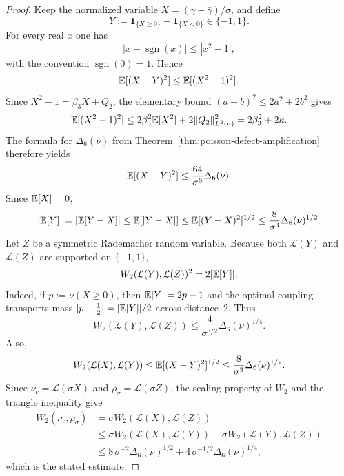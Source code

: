 \begin{proof}
Keep the normalized variable $X=(\gamma-\bar\gamma)/\sigma$, and define
\[
Y:=\mathbf{1}_{\{X\ge 0\}}-\mathbf{1}_{\{X<0\}}\in\{-1,1\}.
\]
For every real $x$ one has
\[
|x-\operatorname{sgn}(x)|\le |x^2-1|,
\]
with the convention $\operatorname{sgn}(0)=1$.  Hence
\[
\mathbb{E}[(X-Y)^2]\le \mathbb{E}[(X^2-1)^2].
\]
Since $X^2-1=\beta_3X+Q_2$, the elementary bound
$(a+b)^2\le 2a^2+2b^2$ gives
\[
\mathbb{E}[(X^2-1)^2]
\le 2\beta_3^2\mathbb{E}[X^2]+2\|Q_2\|_{L^2(\nu)}^2
=2\beta_3^2+2\kappa.
\]
The formula for $\Delta_6(\nu)$ from
Theorem~\ref{thm:poisson-defect-amplification} therefore yields
\[
\mathbb{E}[(X-Y)^2]\le \frac{64}{\sigma^6}\Delta_6(\nu).
\]
Since $\mathbb{E}[X]=0$,
\[
|\mathbb{E}[Y]|=|\mathbb{E}[Y-X]|
\le \mathbb{E}[|Y-X|]
\le \mathbb{E}[(Y-X)^2]^{1/2}
\le \frac{8}{\sigma^3}\Delta_6(\nu)^{1/2}.
\]
Let $Z$ be a symmetric Rademacher random variable.  Because both
$\mathcal L(Y)$ and $\mathcal L(Z)$ are supported on $\{-1,1\}$,
\[
W_2(\mathcal L(Y),\mathcal L(Z))^2=2|\mathbb{E}[Y]|.
\]
Indeed, if $p:=\nu(X\ge 0)$, then $\mathbb{E}[Y]=2p-1$ and the optimal coupling
transports mass $|p-\tfrac12|=|\mathbb{E}[Y]|/2$ across distance~$2$.
Thus
\[
W_2(\mathcal L(Y),\mathcal L(Z))
\le \frac{4}{\sigma^{3/2}}\Delta_6(\nu)^{1/4}.
\]
Also,
\[
W_2(\mathcal L(X),\mathcal L(Y))
\le \mathbb{E}[(X-Y)^2]^{1/2}
\le \frac{8}{\sigma^3}\Delta_6(\nu)^{1/2}.
\]
Since $\nu_c=\mathcal L(\sigma X)$ and $\rho_\sigma=\mathcal L(\sigma Z)$,
the scaling property of $W_2$ and the triangle inequality give
\begin{align*}
W_2(\nu_c,\rho_\sigma)
&=\sigma W_2(\mathcal L(X),\mathcal L(Z)) \\
&\le \sigma W_2(\mathcal L(X),\mathcal L(Y))
+\sigma W_2(\mathcal L(Y),\mathcal L(Z)) \\
&\le
8\,\sigma^{-2}\Delta_6(\nu)^{1/2}
+4\,\sigma^{-1/2}\Delta_6(\nu)^{1/4},
\end{align*}
which is the stated estimate.
\end{proof}
